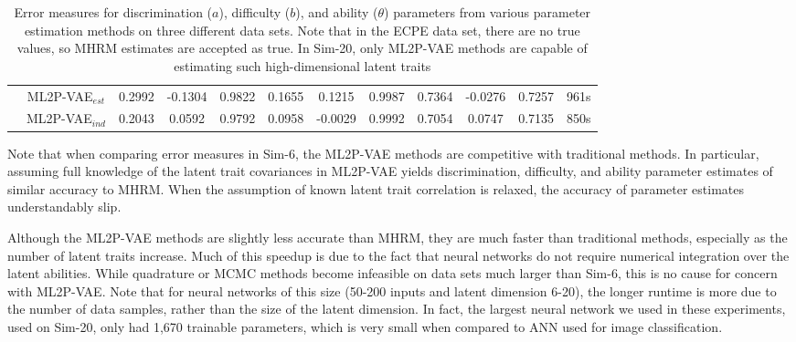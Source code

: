 \begin{table}
{\begin{tabular}{c|c|ccc|ccc|ccc|c}
& ML2P-VAE$_{est}$ & 0.2992  & -0.1304  & 0.9822  & 0.1655 &  0.1215  & 0.9987  & 0.7364   & -0.0276  & 0.7257 & 961s \\
& ML2P-VAE$_{ind}$ & 0.2043 &   0.0592  & 0.9792  & 0.0958   & -0.0029  & 0.9992  & 0.7054 &  0.0747  & 0.7135 & 850s \\
\hline
\end{tabular}
\caption{Error measures for discrimination ($a$), difficulty ($b$), and ability ($\theta$) parameters from various parameter estimation methods on three different data sets. Note that in the ECPE data set, there are no true values, so MHRM estimates are accepted as true. In Sim-20, only ML2P-VAE methods are capable of estimating such high-dimensional latent traits}
  \label{tab:ml2p_results}
}
\end{table}

Note that when comparing error measures in Sim-6, the ML2P-VAE methods are competitive with traditional methods. In particular, assuming full knowledge of the latent trait covariances in ML2P-VAE yields discrimination, difficulty, and ability parameter estimates of similar accuracy to MHRM. When the assumption of known latent trait correlation is relaxed, the accuracy of parameter estimates understandably slip.

Although the ML2P-VAE methods are slightly less accurate than MHRM, they are much faster than traditional methods, especially as the number of latent traits increase. Much of this speedup is due to the fact that neural networks do not require numerical integration over the latent abilities. While quadrature or MCMC methods become infeasible on data sets much larger than Sim-6, this is no cause for concern with ML2P-VAE. Note that for neural networks of this size (50-200 inputs and latent dimension 6-20), the longer runtime is more due to the number of data samples, rather than the size of the latent dimension. In fact, the largest neural network we used in these experiments, used on Sim-20, only had 1,670 trainable parameters, which is very small when compared to ANN used for image classification. 

